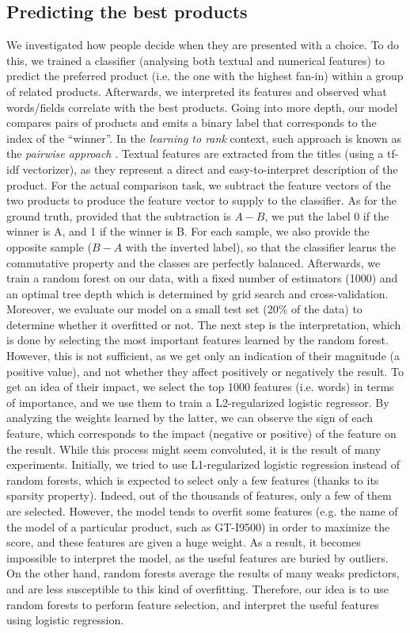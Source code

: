 \documentclass[11pt]{article}
\begin{document}
\subsection{Predicting the best products}
We investigated how people decide when they are presented with a choice. To do this, we trained a classifier (analysing both textual and numerical features) to predict the preferred product (i.e. the one with the highest fan-in) within a group of related products. Afterwards, we interpreted its features and observed what words/fields correlate with the best products. Going into more depth, our model compares pairs of products and emits a binary label that corresponds to the index of the ``winner''. In the \textit{learning to rank} context, such approach is known as the \textit{pairwise approach} \cite{Li:11}.
Textual features are extracted from the titles (using a tf-idf vectorizer), as they represent a direct  and easy-to-interpret description of the product. For the actual comparison task, we subtract the feature vectors of the two products to produce the feature vector to supply to the classifier. As for the ground truth, provided that the subtraction is $A - B$, we put the label 0 if the winner is A, and 1 if the winner is B. For each sample, we also provide the opposite sample ($B - A$ with the inverted label), so that the classifier learns the commutative property and the classes are perfectly balanced.
Afterwards, we train a random forest on our data, with a fixed number of estimators (1000) and an optimal tree depth which is determined by grid search and cross-validation. Moreover, we evaluate our model on a small test set (20\% of the data) to determine whether it overfitted or not. The next step is the interpretation, which is done by selecting the most important features learned by the random forest. However, this is not sufficient, as we get only an indication of their magnitude (a positive value), and not whether they affect positively or negatively the result.
To get an idea of their impact, we select the top 1000 features (i.e. words) in terms of importance, and we use them to train a L2-regularized logistic regressor. By analyzing the weights learned by the latter, we can observe the sign of each feature, which corresponds to the impact (negative or positive) of the feature on the result.
While this process might seem convoluted, it is the result of many experiments. Initially, we tried to use L1-regularized logistic regression instead of random forests, which is expected to select only a few features (thanks to its sparsity property). Indeed, out of the thousands of features, only a few of them are selected. However, the model tends to overfit some features (e.g. the name of the model of a particular product, such as GT-I9500) in order to maximize the score, and these features are given a huge weight. As a result, it becomes impossible to interpret the model, as the useful features are buried by outliers.
On the other hand, random forests average the results of many weaks predictors, and are less susceptible to this kind of overfitting. Therefore, our idea is to use random forests to perform feature selection, and interpret the useful features using logistic regression.
\end{document}
